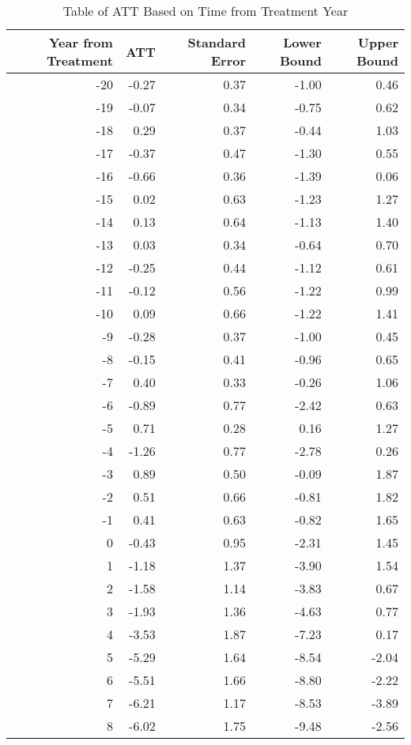\begin{table}[!htbp] \centering 
  \caption{Table of ATT Based on Time from Treatment Year} 
  \label{} 
\begin{tabular}[t]{r|r|r|r|r}
\hline
Year from Treatment & ATT & Standard Error & Lower Bound & Upper Bound\\
\hline
-20 & -0.27 & 0.37 & -1.00 & 0.46\\
\hline
-19 & -0.07 & 0.34 & -0.75 & 0.62\\
\hline
-18 & 0.29 & 0.37 & -0.44 & 1.03\\
\hline
-17 & -0.37 & 0.47 & -1.30 & 0.55\\
\hline
-16 & -0.66 & 0.36 & -1.39 & 0.06\\
\hline
-15 & 0.02 & 0.63 & -1.23 & 1.27\\
\hline
-14 & 0.13 & 0.64 & -1.13 & 1.40\\
\hline
-13 & 0.03 & 0.34 & -0.64 & 0.70\\
\hline
-12 & -0.25 & 0.44 & -1.12 & 0.61\\
\hline
-11 & -0.12 & 0.56 & -1.22 & 0.99\\
\hline
-10 & 0.09 & 0.66 & -1.22 & 1.41\\
\hline
-9 & -0.28 & 0.37 & -1.00 & 0.45\\
\hline
-8 & -0.15 & 0.41 & -0.96 & 0.65\\
\hline
-7 & 0.40 & 0.33 & -0.26 & 1.06\\
\hline
-6 & -0.89 & 0.77 & -2.42 & 0.63\\
\hline
-5 & 0.71 & 0.28 & 0.16 & 1.27\\
\hline
-4 & -1.26 & 0.77 & -2.78 & 0.26\\
\hline
-3 & 0.89 & 0.50 & -0.09 & 1.87\\
\hline
-2 & 0.51 & 0.66 & -0.81 & 1.82\\
\hline
-1 & 0.41 & 0.63 & -0.82 & 1.65\\
\hline
0 & -0.43 & 0.95 & -2.31 & 1.45\\
\hline
1 & -1.18 & 1.37 & -3.90 & 1.54\\
\hline
2 & -1.58 & 1.14 & -3.83 & 0.67\\
\hline
3 & -1.93 & 1.36 & -4.63 & 0.77\\
\hline
4 & -3.53 & 1.87 & -7.23 & 0.17\\
\hline
5 & -5.29 & 1.64 & -8.54 & -2.04\\
\hline
6 & -5.51 & 1.66 & -8.80 & -2.22\\
\hline
7 & -6.21 & 1.17 & -8.53 & -3.89\\
\hline
8 & -6.02 & 1.75 & -9.48 & -2.56\\
\hline
\end{tabular}
\end{table} 